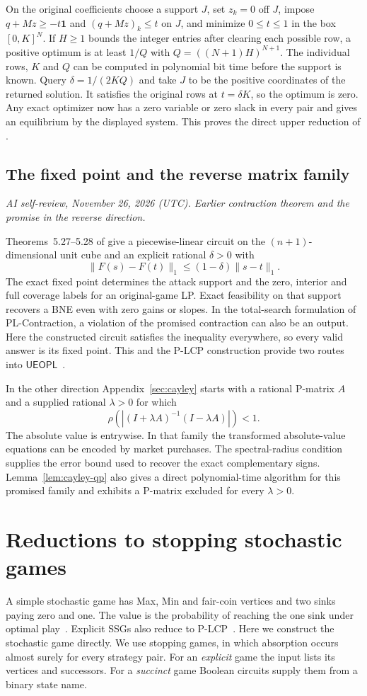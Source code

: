 \documentclass[11pt,oneside,openany,notitlepage]{report}
\newcommand{\reviewdate}{November 26, 2026 (UTC)}
\newcommand{\reviewmark}[1]{\par\nopagebreak[4]\noindent
  {\footnotesize\itshape AI self-review, \reviewdate. #1\par}\nobreak\smallskip}
\begin{document}
On the original coefficients choose a support \(J\), set \(z_k=0\)
off \(J\), impose \(q+Mz\ge -t\mathbf1\) and
\((q+Mz)_k\le t\) on \(J\), and minimize \(0\le t\le1\) in the box
\([0,K]^N\). If \(H\ge1\) bounds the integer entries after clearing
each possible row, a positive optimum is at least \(1/Q\) with
\(Q=((N+1)H)^{N+1}\). The individual rows, \(K\) and \(Q\) can be
computed in polynomial bit time before the support is known. Query
\(\delta=1/(2KQ)\) and take \(J\) to be the positive coordinates of
the returned solution. It satisfies the original rows at \(t=\delta K\),
so the optimum is zero. Any exact optimizer now has a zero variable or
zero slack in every pair and gives an equilibrium by the displayed
system. This proves the direct upper reduction of \cite[Theorem~5.19]{book}.

\section{The fixed point and the reverse matrix family}
\reviewmark{Earlier contraction theorem and the promise in the reverse direction.}

Theorems~5.27--5.28 of \cite{book} give a piecewise-linear circuit on the
\((n+1)\)-dimensional unit cube and an explicit rational \(\delta>0\) with
\[
    \|F(s)-F(t)\|_1\le(1-\delta)\|s-t\|_1 .
\]
The exact fixed point
determines the attack support and the zero, interior and full coverage
labels for an original-game LP. Exact feasibility on that support
recovers a BNE even with zero gains or slopes. In the total-search
formulation of PL-Contraction, a violation of the promised
contraction can also be an output. Here the constructed circuit
satisfies the inequality everywhere, so every valid answer is its fixed
point. This and the P-LCP construction provide two routes into
\(\mathsf{UEOPL}\)~\cite{book,fgms}.

In the other direction Appendix~\ref{sec:cayley} starts with a rational
P-matrix \(A\) and a supplied rational \(\lambda>0\) for which
\[
 \rho\!\left(\left|(I+\lambda A)^{-1}(I-\lambda A)\right|\right)<1 .
\]
The absolute value is entrywise. In that family the transformed
absolute-value equations can be encoded by market purchases. The
spectral-radius condition supplies the error bound used to recover the
exact complementary signs. Lemma~\ref{lem:cayley-qp} also gives a
direct polynomial-time algorithm for this promised family and exhibits
a P-matrix excluded for every \(\lambda>0\).

\chapter{Reductions to stopping stochastic games}\label{sec:ssg}
A simple stochastic game has Max, Min and fair-coin vertices and two
sinks paying zero and one. The value is the probability of reaching the
one sink under optimal play~\cite{condon}. Explicit SSGs also reduce to
P-LCP~\cite[\S1]{fgms}. Here we construct the stochastic game directly.
We use stopping games, in which
absorption occurs almost surely for every strategy pair. For an
\emph{explicit} game the input lists its vertices and successors. For a
\emph{succinct} game Boolean circuits supply them from a binary state name.
\end{document}
